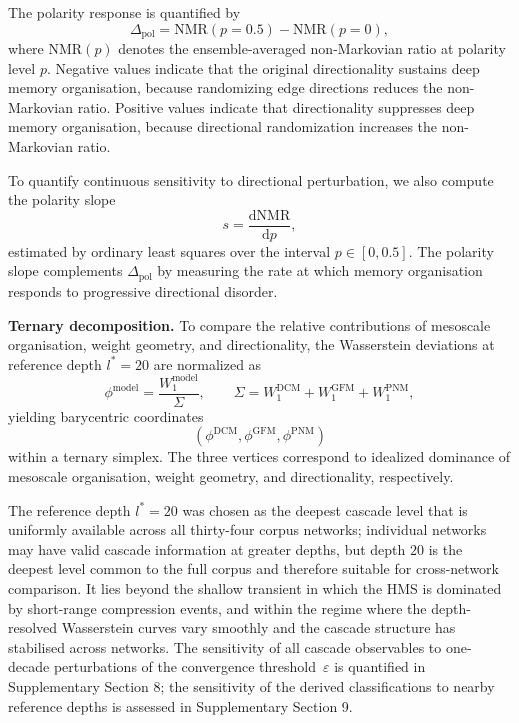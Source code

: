 \documentclass[aps,superscriptaddress,11pt]{revtex4-2}
\newcommand{\NMR}{\mathrm{NMR}}
\theoremstyle{definition}
\theoremstyle{plain}
\begin{document}
The polarity response is quantified by
\begin{equation}
  \Delta_{\mathrm{pol}}
  =
  \NMR(p=0.5)-\NMR(p=0),
  \label{eq:delta_pol_methods}
\end{equation}
where $\NMR(p)$ denotes the ensemble-averaged non-Markovian ratio at
polarity level $p$. Negative values indicate that the original
directionality sustains deep memory organisation, because randomizing edge
directions reduces the non-Markovian ratio. Positive values indicate that
directionality suppresses deep memory organisation, because directional
randomization increases the non-Markovian ratio.

To quantify continuous sensitivity to directional perturbation, we also
compute the polarity slope
\[
s=\frac{\mathrm{d}\NMR}{\mathrm{d}p},
\]
estimated by ordinary least squares over the interval
$p\in[0,0.5]$. The polarity slope complements
$\Delta_{\mathrm{pol}}$ by measuring the rate at which memory organisation
responds to progressive directional disorder.

\medskip
\noindent\textbf{Ternary decomposition.}
To compare the relative contributions of mesoscale organisation, weight
geometry, and directionality, the Wasserstein deviations at reference depth
$l^\ast=20$ are normalized as
\begin{equation}
  \phi^{\mathrm{model}}
  =
  \frac{W_1^{\mathrm{model}}}{\Sigma},
  \qquad
  \Sigma
  =
  W_1^{\mathrm{DCM}}
  +
  W_1^{\mathrm{GFM}}
  +
  W_1^{\mathrm{PNM}},
  \label{eq:ternary_methods}
\end{equation}
yielding barycentric coordinates
\[
(\phi^{\mathrm{DCM}},
 \phi^{\mathrm{GFM}},
 \phi^{\mathrm{PNM}})
\]
within a ternary simplex. The three vertices correspond to idealized
dominance of mesoscale organisation, weight geometry, and directionality,
respectively.


The reference depth $l^* = 20$ was chosen as the deepest cascade level
that is uniformly available across all thirty-four corpus networks;
individual networks may have valid cascade information at greater depths,
but depth $20$ is the deepest level common to the full corpus and
therefore suitable for cross-network comparison.  It lies beyond the
shallow transient in which the HMS is dominated by short-range
compression events, and within the regime where the depth-resolved
Wasserstein curves vary smoothly and the cascade structure has stabilised
across networks.  The sensitivity of all cascade observables to
one-decade perturbations of the convergence threshold~$\varepsilon$ is
quantified in Supplementary Section 8; the
sensitivity of the derived classifications to nearby reference depths
is assessed in Supplementary Section 9.
\end{document}
